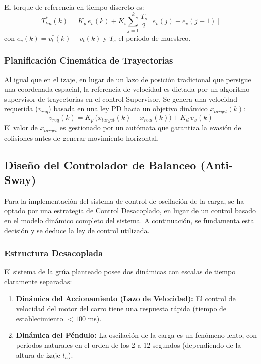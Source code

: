 \documentclass[11pt]{article}                                    %
\begin{document}
El torque de referencia en tiempo discreto es:
\begin{equation}
    T_{tm}^\ast(k) = K_p\,e_v(k) + K_i \sum_{j=1}^{k} \frac{T_s}{2}\left[e_v(j) + e_v(j-1)\right]
\end{equation}
con $e_v(k) = v_t^\ast(k) - v_t(k)$ y $T_s$ el período de muestreo.

\subsubsection{Planificación Cinemática de Trayectorias}
Al igual que en el izaje, en lugar de un lazo de posición tradicional que persigue una coordenada espacial, la referencia de velocidad es dictada por un algoritmo supervisor de trayectorias en el control Supervisor. Se genera una velocidad requerida ($v_{req}$) basada en una ley PD hacia un objetivo dinámico $x_{target}(k)$:
\begin{equation}
    v_{req}(k) = K_{p} \, \bigl(x_{target}(k) - x_{real}(k)\bigr) + K_{d} \, v_{x}(k)
\end{equation}
El valor de $x_{target}$ es gestionado por un autómata que garantiza la evasión de colisiones antes de generar movimiento horizontal. 

\subsection{Diseño del Controlador de Balanceo (Anti-Sway)}
Para la implementación del sistema de control de oscilación de la carga, se ha optado por una estrategia de Control Desacoplado, en lugar de un control basado en el modelo dinámico completo del sistema. A continuación, se fundamenta esta decisión y se deduce la ley de control utilizada.

\subsubsection{Estructura Desacoplada}
El sistema de la grúa planteado posee dos dinámicas con escalas de tiempo claramente separadas:
\begin{enumerate}
    \item \textbf{Dinámica del Accionamiento (Lazo de Velocidad):} El control de velocidad del motor del carro tiene una respuesta rápida (tiempo de establecimiento $< 100$ ms).
    \item \textbf{Dinámica del Péndulo:} La oscilación de la carga es un fenómeno lento, con periodos naturales en el orden de los 2 a 12 segundos (dependiendo de la altura de izaje $l_h$).
\end{enumerate}
\end{document}
